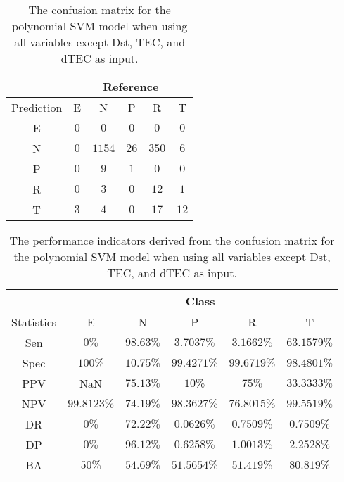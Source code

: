 \begin{table}[!ht]
	\centering
	\begin{tabular}{|c|c|c|c|c|c|}
		\hline
		 & \multicolumn{5}{|c|}{Reference} \\ \hline
		 Prediction & E & N & P & R & T \\ \hline
		 E & $0$ & $0$ & $0$ & $0$ & $0$ \\ \hline
		 N & $0$ & $1154$ & $26$ & $350$ & $6$ \\ \hline
		 P & $0$ & $9$ & $1$ & $0$ & $0$ \\ \hline
		 R & $0$ & $3$ & $0$ & $12$ & $1$ \\ \hline
		 T & $3$ & $4$ & $0$ & $17$ & $12$ \\ \hline
	\end{tabular}
	\caption{The confusion matrix for the polynomial SVM model when using all variables except Dst, TEC, and dTEC as input.}
	\label{tab:cm:noTEC:svmPoly}
\end{table}

\begin{table}[!ht]
	\centering
	\begin{tabular}{|c|c|c|c|c|c|}
		\hline
		 & \multicolumn{5}{c|}{Class} \\ \hline
		Statistics & E & N & P & R & T \\ \hline
		Sen & $0\%$ & $98.63\%$ & $3.7037\%$ & $3.1662\%$ & $63.1579\%$ \\ \hline
		Spec & $100\%$ & $10.75\%$ & $99.4271\%$ & $99.6719\%$ & $98.4801\%$ \\ \hline
		PPV & NaN & $75.13\%$ & $10\%$ & $75\%$ & $33.3333\%$ \\ \hline
		NPV & $99.8123\%$ & $74.19\%$ & $98.3627\%$ & $76.8015\%$ & $99.5519\%$ \\ \hline
		DR & $0\%$ & $72.22\%$ & $0.0626\%$ & $0.7509\%$ & $0.7509\%$ \\ \hline
		DP & $0\%$ & $96.12\%$ & $0.6258\%$ & $1.0013\%$ & $2.2528\%$ \\ \hline
		BA & $50\%$ & $54.69\%$ & $51.5654\%$ & $51.419\%$ & $80.819\%$ \\ \hline
	\end{tabular}
	\caption{The performance indicators derived from the confusion matrix for the polynomial SVM model when using all variables except Dst, TEC, and dTEC as input.}
	\label{tab:cs:reverse:noTEC:svmPoly}
\end{table}


